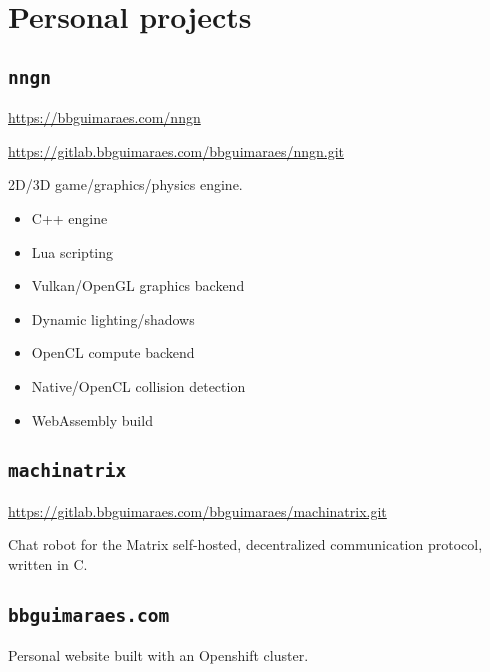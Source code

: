 \section*{Personal projects}
\label{sec:projects}

\subsection*{\texttt{nngn}}

\url{https://bbguimaraes.com/nngn}

\url{https://gitlab.bbguimaraes.com/bbguimaraes/nngn.git}

2D/3D game/graphics/physics engine.

\begin{itemize}
    \item C++ engine
    \item Lua scripting
    \item Vulkan/OpenGL graphics backend
    \item Dynamic lighting/shadows
    \item OpenCL compute backend
    \item Native/OpenCL collision detection
    \item WebAssembly build
\end{itemize}

\subsection*{\texttt{machinatrix}}

\url{https://gitlab.bbguimaraes.com/bbguimaraes/machinatrix.git}

Chat robot for the Matrix self-hosted, decentralized communication protocol,
written in C.

\subsection*{\texttt{bbguimaraes.com}}

Personal website built with an Openshift cluster.

